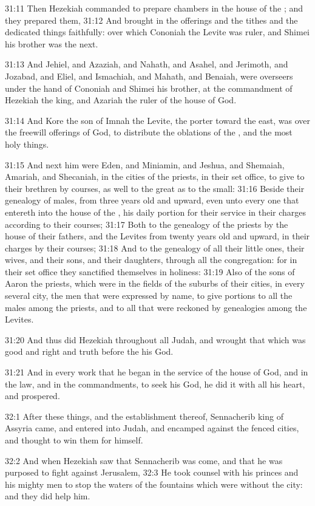 31:11 Then Hezekiah commanded to prepare chambers in the house of the \LORD; and they prepared them, 31:12 And brought in the offerings and the tithes and the dedicated things faithfully: over which Cononiah the Levite was ruler, and Shimei his brother was the next.

31:13 And Jehiel, and Azaziah, and Nahath, and Asahel, and Jerimoth, and Jozabad, and Eliel, and Ismachiah, and Mahath, and Benaiah, were overseers under the hand of Cononiah and Shimei his brother, at the commandment of Hezekiah the king, and Azariah the ruler of the house of God.

31:14 And Kore the son of Imnah the Levite, the porter toward the east, was over the freewill offerings of God, to distribute the oblations of the \LORD, and the most holy things.

31:15 And next him were Eden, and Miniamin, and Jeshua, and Shemaiah, Amariah, and Shecaniah, in the cities of the priests, in their set office, to give to their brethren by courses, as well to the great as to the small: 31:16 Beside their genealogy of males, from three years old and upward, even unto every one that entereth into the house of the \LORD, his daily portion for their service in their charges according to their courses; 31:17 Both to the genealogy of the priests by the house of their fathers, and the Levites from twenty years old and upward, in their charges by their courses; 31:18 And to the genealogy of all their little ones, their wives, and their sons, and their daughters, through all the congregation: for in their set office they sanctified themselves in holiness: 31:19 Also of the sons of Aaron the priests, which were in the fields of the suburbs of their cities, in every several city, the men that were expressed by name, to give portions to all the males among the priests, and to all that were reckoned by genealogies among the Levites.

31:20 And thus did Hezekiah throughout all Judah, and wrought that which was good and right and truth before the \LORD his God.

31:21 And in every work that he began in the service of the house of God, and in the law, and in the commandments, to seek his God, he did it with all his heart, and prospered.

32:1 After these things, and the establishment thereof, Sennacherib king of Assyria came, and entered into Judah, and encamped against the fenced cities, and thought to win them for himself.

32:2 And when Hezekiah saw that Sennacherib was come, and that he was purposed to fight against Jerusalem, 32:3 He took counsel with his princes and his mighty men to stop the waters of the fountains which were without the city: and they did help him.


